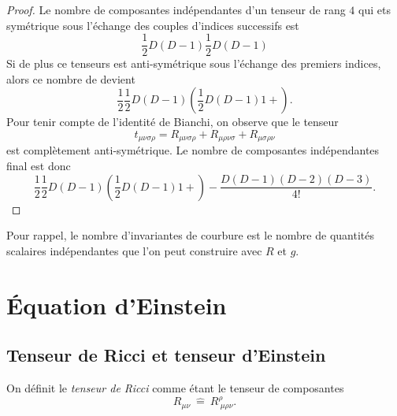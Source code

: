 \documentclass[a4paper,11pt]{report}
\begin{document}
                \begin{proof}
                    Le nombre de composantes indépendantes d'un tenseur de rang $4$ qui ets symétrique sous l'échange des couples d'indices successifs est 
                    \begin{equation}
                        \frac{1}{2}D(D-1)\frac{1}{2}D(D-1)
                    \end{equation}
                    Si de plus ce tenseurs est anti-symétrique sous l'échange des premiers indices, alors ce nombre de devient
                    \begin{equation}
                        \frac{1}{2}\frac{1}{2}D(D-1)\left( \frac{1}{2}D(D-1)1+ \right).
                    \end{equation}
                    Pour tenir compte de l'identité de Bianchi, on observe que le tenseur
                    \begin{equation}
                        t_{\mu\nu\sigma\rho} = R_{\mu\nu\sigma\rho}+R_{\mu\rho\nu\sigma}+R_{\mu\sigma\rho\nu}
                    \end{equation}
                    est complètement anti-symétrique. Le nombre de composantes indépendantes final est donc 
                    \begin{equation}
                        \frac{1}{2}\frac{1}{2}D(D-1)\left( \frac{1}{2}D(D-1)1+ \right)  -\frac{D(D-1)(D-2)(D-3)}{4!}.
                    \end{equation}
                \end{proof}
                
                Pour rappel, le nombre d'invariantes de courbure est le nombre de quantités scalaires indépendantes que l'on peut construire avec $R$ et $g$.
                
\chapter{Équation d'Einstein}

    
        
    \section{Tenseur de Ricci et tenseur d'Einstein}
        
        \begin{definition}
            On définit le \textit{tenseur de Ricci} comme étant le tenseur de composantes
            \begin{equation}
                R_{\mu\nu} ~\hat{=}~ R^\rho_{~\mu\rho\nu}.
            \end{equation}
        \end{definition}
        
\end{document}
